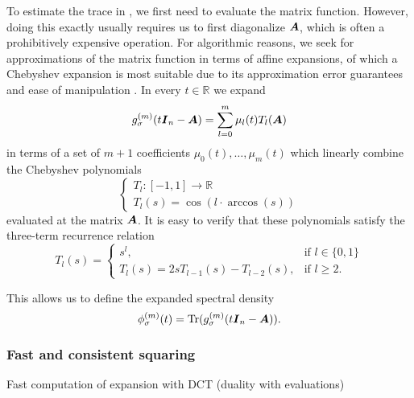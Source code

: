 \documentclass[12pt]{article}
\begin{document}
To estimate the trace in , we first need to evaluate the matrix function. However, doing this exactly usually requires us to first diagonalize $\boldsymbol{A}$, which is often a prohibitively expensive operation. For algorithmic reasons, we seek for approximations of the matrix function in terms of affine expansions, of which a Chebyshev expansion is most suitable due to its approximation error guarantees and ease of manipulation . In every $t \in \mathbb{R}$ we expand 
\begin{equation}
    g_{\sigma}^{(m)}(t\boldsymbol{I}_n - \boldsymbol{A}) = \sum_{l=0}^{m} \mu_l(t) T_l(\boldsymbol{A})
    \label{equ:matrix-expansion}
\end{equation}
in terms of a set of $m+1$ coefficients $\mu_0(t), \dots, \mu_m(t)$ which linearly combine the Chebyshev polynomials
\begin{equation}
    \begin{cases}
        T_l : [-1, 1] \to \mathbb{R} \\
        T_l(s) = \cos(l \cdot \arccos(s))
    \end{cases}
    \label{equ:chebyshev-polynomial}
\end{equation}
evaluated at the matrix $\boldsymbol{A}$. It is easy to verify that these polynomials satisfy the three-term recurrence relation
\begin{equation}
    T_l(s) =
    \begin{cases}
        s^l, & \text{if $l \in \{0, 1\}$} \\
        T_l(s) = 2 s T_{l-1}(s) - T_{l-2}(s), & \text{if $l \geq 2$.}
    \end{cases}
    \label{equ:chebyshev-recurrence}
\end{equation}

This allows us to define the expanded spectral density
\begin{equation}
    \phi_{\sigma}^{(m)}(t) = \operatorname{Tr}(g_{\sigma}^{(m)}(t \boldsymbol{I}_n - \boldsymbol{A})).
    \label{equ:expanded-spectral-density}
\end{equation}

\subsubsection{Fast and consistent squaring}
\label{subsubsec:dct}

Fast computation of expansion with DCT (duality with evaluations)
\end{document}
